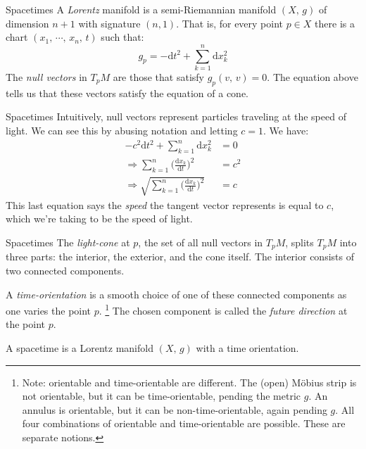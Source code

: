 \documentclass{beamer}
\begin{document}
    \begin{frame}{Spacetimes}
        A \textit{Lorentz} manifold is a semi-Riemannian manifold $(X,\,g)$ of
        dimension $n+1$ with signature $(n,1)$. That is, for every point
        $p\in{X}$ there is a chart $(x_{1},\,\cdots,\,x_{n},\,t)$ such that:
        \begin{equation}
            g_{p}=-\textrm{d}t^{2}+\sum_{k=1}^{n}\textrm{d}x_{k}^{2}
        \end{equation}
        The \textit{null vectors} in $T_{p}M$ are those that satisfy
        $g_{p}(v,\,v)=0$. The equation above tells us that these vectors
        satisfy the equation of a cone.
    \end{frame}
    \begin{frame}{Spacetimes}
        Intuitively, null vectors represent particles traveling at the speed of
        light. We can see this by abusing notation and letting $c=1$. We have:
        \begin{align}
            -c^{2}\textrm{d}t^{2}+\sum_{k=1}^{n}\textrm{d}x_{k}^{2}&=0\\
            \Rightarrow
            \sum_{k=1}^{n}\Big(\frac{\textrm{d}x_{k}}{\textrm{d}t}\Big)^{2}
                &=c^{2}\\
            \Rightarrow
            \sqrt{\sum_{k=1}^{n}\Big(\frac{\textrm{d}x_{k}}{\textrm{d}t}\Big)^{2}}
            &=c
        \end{align}
        This last equation says the \textit{speed} the tangent vector
        represents is equal to $c$, which we're taking to be the speed of light.
    \end{frame}
    \begin{frame}{Spacetimes}
        The \textit{light-cone} at $p$, the set of all null vectors in
        $T_{p}M$, splits $T_{p}M$ into three parts: the interior, the exterior,
        and the cone itself. The interior consists of two connected components.
        \par\hfill\par
        A \textit{time-orientation} is a smooth choice of one of these connected
        components as one varies the point $p$.%
        \footnote{%
            Note: orientable and time-orientable are different. The (open)
            M\"{o}bius strip is not orientable, but it can be time-orientable,
            pending the metric $g$. An annulus is orientable, but it can be
            non-time-orientable, again pending $g$. All four combinations of
            orientable and time-orientable are possible. These are separate
            notions.
        }
        The chosen component is called the \textit{future direction} at the
        point $p$.
        \par\hfill\par
        A spacetime is a Lorentz manifold $(X,\,g)$ with a time orientation.
    \end{frame}
\end{document}
